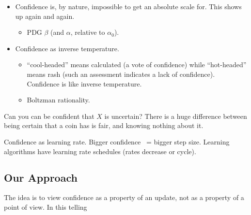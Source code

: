 \documentclass{article}
\begin{document}
\begin{itemize}
\item 
Confidence is, by nature, impossible to get an absolute scale for. This shows up again and again. 
\begin{itemize}[nosep]
    \item PDG $\beta$ (and $\alpha$, relative to $\alpha_0$).
\end{itemize}

\item Confidence as inverse temperature.

\begin{itemize}
    \item
    ``cool-headed'' means calculated (a vote of confidence) while ``hot-headed'' means rash (such an assessment indicates a lack of confidence). Confidence is like inverse temperature.
    
    \item Boltzman rationality.
\end{itemize}

\end{itemize}






Can you can be confident that $X$ is uncertain?
There is a huge difference between being certain that a coin has is fair, and knowing nothing about it.







Confidence as learning rate. Bigger confidence ~= bigger step size.
Learning algorithms have learning rate schedules (rates decrease or cycle).

\subsection*{Our Approach}
The idea is to view confidence as a property of an update, not as a property of a point of view.
In this telling
\end{document}
